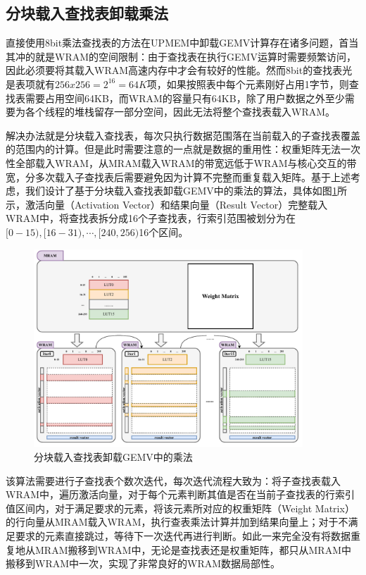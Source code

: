 \subsection{分块载入查找表卸载乘法}
直接使用8bit乘法查找表的方法在UPMEM中卸载GEMV计算存在诸多问题，首当其冲的就是WRAM的空间限制：由于查找表在执行GEMV运算时需要频繁访问，因此必须要将其载入WRAM高速内存中才会有较好的性能。然而8bit的查找表光是表项就有$256x256=2^{16}=64K$项，如果按照表中每个元素刚好占用1字节，则查找表需要占用空间64KB，而WRAM的容量只有64KB，除了用户数据之外至少需要为各个线程的堆栈留存一部分空间，因此无法将整个查找表载入WRAM。

解决办法就是分块载入查找表，每次只执行数据范围落在当前载入的子查找表覆盖的范围内的计算。但是此时需要注意的一点就是数据的重用性：权重矩阵无法一次性全部载入WRAM，从MRAM载入WRAM的带宽远低于WRAM与核心交互的带宽，分多次载入子查找表后需要避免因为计算不完整而重复载入矩阵。基于上述考虑，我们设计了基于分块载入查找表卸载GEMV中的乘法的算法，具体如图\ref{LUTBlock}所示，激活向量（Activation Vector）和结果向量（Result Vector）完整载入WRAM中，将查找表拆分成16个子查找表，行索引范围被划分为在$[0-15),[16-31),\cdots,[240,256)$16个区间。

\begin{figure}[!htbp]
	\centering
    \includegraphics[width=0.9\textwidth]{figures/LUTBlock.pdf}
	\caption{分块载入查找表卸载GEMV中的乘法}
    \label{LUTBlock}
\end{figure}

该算法需要进行子查找表个数次迭代，每次迭代流程大致为：将子查找表载入WRAM中，遍历激活向量，对于每个元素判断其值是否在当前子查找表的行索引值区间内，对于满足要求的元素，将该元素所对应的权重矩阵（Weight Matrix）的行向量从MRAM载入WRAM，执行查表乘法计算并加到结果向量上；对于不满足要求的元素直接跳过，等待下一次迭代再进行判断。如此一来完全没有将数据重复地从MRAM搬移到WRAM中，无论是查找表还是权重矩阵，都只从MRAM中搬移到WRAM中一次，实现了非常良好的WRAM数据局部性。

